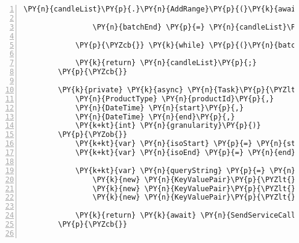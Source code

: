 \begin{Verbatim}[commandchars=\\\{\},numbers=left,firstnumber=1,stepnumber=1,numberblanklines=0]
                \PY{n}{candleList}\PY{p}{.}\PY{n}{AddRange}\PY{p}{(}\PY{k}{await} \PY{n}{GetHistoricRatesAsync}\PY{p}{(}\PY{n}{productPair}\PY{p}{,} \PY{n}{batchStart}\PY{p}{,} \PY{n}{batchEnd}\PY{p}{.}\PY{n}{Value}\PY{p}{,} \PY{p}{(}\PY{k+kt}{int}\PY{p}{)}\PY{n}{granularity}\PY{p}{)}\PY{p}{)}\PY{p}{;}

                \PY{n}{batchEnd} \PY{p}{=} \PY{n}{candleList}\PY{p}{.}\PY{n}{LastOrDefault}\PY{p}{(}\PY{p}{)}\PY{p}{?}\PY{p}{.}\PY{n}{Time}\PY{p}{;}

            \PY{p}{\PYZcb{}} \PY{k}{while} \PY{p}{(}\PY{n}{batchStart} \PY{p}{\PYZgt{}} \PY{n}{start}\PY{p}{)}\PY{p}{;}

            \PY{k}{return} \PY{n}{candleList}\PY{p}{;}
        \PY{p}{\PYZcb{}}

        \PY{k}{private} \PY{k}{async} \PY{n}{Task}\PY{p}{\PYZlt{}}\PY{n}{IList}\PY{p}{\PYZlt{}}\PY{n}{Candle}\PY{p}{\PYZgt{}}\PY{p}{\PYZgt{}} \PY{n}{GetHistoricRatesAsync}\PY{p}{(}
			\PY{n}{ProductType} \PY{n}{productId}\PY{p}{,}
			\PY{n}{DateTime} \PY{n}{start}\PY{p}{,}
			\PY{n}{DateTime} \PY{n}{end}\PY{p}{,}
			\PY{k+kt}{int} \PY{n}{granularity}\PY{p}{)}
        \PY{p}{\PYZob{}}
            \PY{k+kt}{var} \PY{n}{isoStart} \PY{p}{=} \PY{n}{start}\PY{p}{.}\PY{n}{ToString}\PY{p}{(}\PY{l+s}{\PYZdq{}s\PYZdq{}}\PY{p}{)}\PY{p}{;}
            \PY{k+kt}{var} \PY{n}{isoEnd} \PY{p}{=} \PY{n}{end}\PY{p}{.}\PY{n}{ToString}\PY{p}{(}\PY{l+s}{\PYZdq{}s\PYZdq{}}\PY{p}{)}\PY{p}{;}

            \PY{k+kt}{var} \PY{n}{queryString} \PY{p}{=} \PY{n}{queryBuilder}\PY{p}{.}\PY{n}{BuildQuery}\PY{p}{(}
                \PY{k}{new} \PY{n}{KeyValuePair}\PY{p}{\PYZlt{}}\PY{k+kt}{string}\PY{p}{,} \PY{k+kt}{string}\PY{p}{\PYZgt{}}\PY{p}{(}\PY{l+s}{\PYZdq{}start\PYZdq{}}\PY{p}{,} \PY{n}{isoStart}\PY{p}{)}\PY{p}{,}
                \PY{k}{new} \PY{n}{KeyValuePair}\PY{p}{\PYZlt{}}\PY{k+kt}{string}\PY{p}{,} \PY{k+kt}{string}\PY{p}{\PYZgt{}}\PY{p}{(}\PY{l+s}{\PYZdq{}end\PYZdq{}}\PY{p}{,} \PY{n}{isoEnd}\PY{p}{)}\PY{p}{,}
                \PY{k}{new} \PY{n}{KeyValuePair}\PY{p}{\PYZlt{}}\PY{k+kt}{string}\PY{p}{,} \PY{k+kt}{string}\PY{p}{\PYZgt{}}\PY{p}{(}\PY{l+s}{\PYZdq{}granularity\PYZdq{}}\PY{p}{,} \PY{n}{granularity}\PY{p}{.}\PY{n}{ToString}\PY{p}{(}\PY{p}{)}\PY{p}{)}\PY{p}{)}\PY{p}{;}

            \PY{k}{return} \PY{k}{await} \PY{n}{SendServiceCall}\PY{p}{\PYZlt{}}\PY{n}{IList}\PY{p}{\PYZlt{}}\PY{n}{Candle}\PY{p}{\PYZgt{}}\PY{p}{\PYZgt{}}\PY{p}{(}\PY{n}{HttpMethod}\PY{p}{.}\PY{n}{Get}\PY{p}{,} \PY{err}{\PYZdl{}}\PY{l+s}{\PYZdq{}/products/\PYZob{}productId.GetEnumMemberValue()\PYZcb{}/candles\PYZdq{}} \PY{p}{+} \PY{n}{queryString}\PY{p}{)}\PY{p}{.}\PY{n}{ConfigureAwait}\PY{p}{(}\PY{k}{false}\PY{p}{)}\PY{p}{;}
        \PY{p}{\PYZcb{}}


\end{Verbatim}
